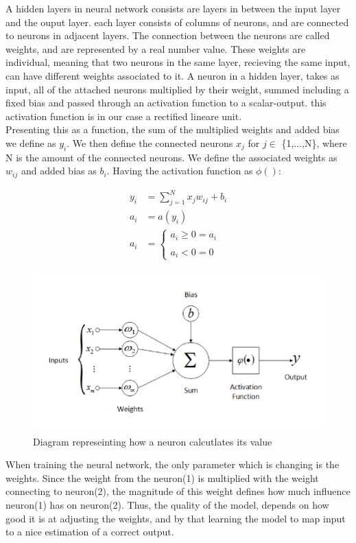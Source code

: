 
A hidden layers in neural network consists are layers in between the input layer and the ouput layer. each layer consists of columns of neurons, and are connected to neurons in adjacent layers. The connection between the neurons are called weights, and are represented by a real number value. These weights are individual, meaning that two neurons in the same layer, recieving the same input, can have different weights associated to it. A neuron in a hidden layer, takes as input, all of the attached neurons multiplied by their weight, summed including a fixed bias and passed through an activation function to a scalar-output. this activation function is in our case a rectified lineare unit.\\

\noindent
Presenting this as a function, the sum of the multiplied weights and added bias we define as $y_i$. We then define the connected neurons $x_j$ for $j \in$ \{1,...,N\}, where N is the amount of the connected neurons. We define the associated weights as $w_{ij}$ and added bias as $b_i$. Having the activation function as $\phi()$:

\begin{align}
	y_i &= \sum^N_{j=1} x_jw_{ij} + b_i\\
	a_i &= a(y_i) \\
	a_i &=\left\{ \begin{matrix}
		a_i \geq 0 = a_i \\
		\\
		a_i < 0 = 0
	\end{matrix}
	\right.
\end{align}


\begin{figure}[!ht]
  \centering
  \includegraphics[scale=1.0]{latex/imgs/neuronFunc.png}
  \caption{Diagram represeinting how a neuron calcutlates its value}\label{Baseline:before}
\end{figure}

\noindent
When training the neural network, the only parameter which is changing is the weights. Since the weight from the neuron(1) is multiplied with the weight connecting to neuron(2), the magnitude of this weight defines how much influence neuron(1) has on neuron(2). Thus, the quality of the model, depends on how good it is at adjusting the weights, and by that learning the model to map input to a nice estimation of a correct output.
